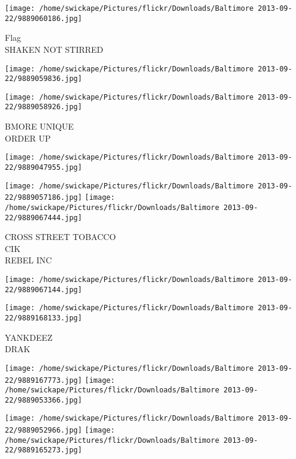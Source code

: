 \documentclass[10pt,letterpaper]{article}
\begin{document}
\vspace{0.25in}
\texttt{[image: /home/swickape/Pictures/flickr/Downloads/Baltimore 2013-09-22/9889060186.jpg]}

Flag\\
SHAKEN NOT STIRRED\\
\pagebreak

\texttt{[image: /home/swickape/Pictures/flickr/Downloads/Baltimore 2013-09-22/9889059836.jpg]}

\vspace{0.25in}
\texttt{[image: /home/swickape/Pictures/flickr/Downloads/Baltimore 2013-09-22/9889058926.jpg]}

BMORE UNIQUE\\
ORDER UP\\
\pagebreak

\texttt{[image: /home/swickape/Pictures/flickr/Downloads/Baltimore 2013-09-22/9889047955.jpg]}

\vspace{0.25in}
\texttt{[image: /home/swickape/Pictures/flickr/Downloads/Baltimore 2013-09-22/9889057186.jpg]}
\texttt{[image: /home/swickape/Pictures/flickr/Downloads/Baltimore 2013-09-22/9889067444.jpg]}

CROSS STREET TOBACCO\\
CIK\\
REBEL INC\\
\pagebreak

\texttt{[image: /home/swickape/Pictures/flickr/Downloads/Baltimore 2013-09-22/9889067144.jpg]}

\vspace{0.25in}
\texttt{[image: /home/swickape/Pictures/flickr/Downloads/Baltimore 2013-09-22/9889168133.jpg]}

YANKDEEZ\\
DRAK\\
\pagebreak

\texttt{[image: /home/swickape/Pictures/flickr/Downloads/Baltimore 2013-09-22/9889167773.jpg]}
\texttt{[image: /home/swickape/Pictures/flickr/Downloads/Baltimore 2013-09-22/9889053366.jpg]}

\texttt{[image: /home/swickape/Pictures/flickr/Downloads/Baltimore 2013-09-22/9889052966.jpg]}
\texttt{[image: /home/swickape/Pictures/flickr/Downloads/Baltimore 2013-09-22/9889165273.jpg]}
\end{document}
